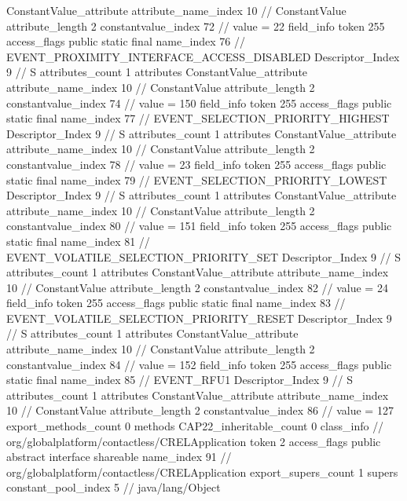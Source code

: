 {{{{{{				ConstantValue_attribute {
					attribute_name_index	10		// ConstantValue
					attribute_length	2
					constantvalue_index	72		// value = 22
				}
				}
			}
			field_info {
				token	255
				access_flags	public static final
				name_index	76		// EVENT_PROXIMITY_INTERFACE_ACCESS_DISABLED
				Descriptor_Index	9		// S
				attributes_count	1
				attributes {
				ConstantValue_attribute {
					attribute_name_index	10		// ConstantValue
					attribute_length	2
					constantvalue_index	74		// value = 150
				}
				}
			}
			field_info {
				token	255
				access_flags	public static final
				name_index	77		// EVENT_SELECTION_PRIORITY_HIGHEST
				Descriptor_Index	9		// S
				attributes_count	1
				attributes {
				ConstantValue_attribute {
					attribute_name_index	10		// ConstantValue
					attribute_length	2
					constantvalue_index	78		// value = 23
				}
				}
			}
			field_info {
				token	255
				access_flags	public static final
				name_index	79		// EVENT_SELECTION_PRIORITY_LOWEST
				Descriptor_Index	9		// S
				attributes_count	1
				attributes {
				ConstantValue_attribute {
					attribute_name_index	10		// ConstantValue
					attribute_length	2
					constantvalue_index	80		// value = 151
				}
				}
			}
			field_info {
				token	255
				access_flags	public static final
				name_index	81		// EVENT_VOLATILE_SELECTION_PRIORITY_SET
				Descriptor_Index	9		// S
				attributes_count	1
				attributes {
				ConstantValue_attribute {
					attribute_name_index	10		// ConstantValue
					attribute_length	2
					constantvalue_index	82		// value = 24
				}
				}
			}
			field_info {
				token	255
				access_flags	public static final
				name_index	83		// EVENT_VOLATILE_SELECTION_PRIORITY_RESET
				Descriptor_Index	9		// S
				attributes_count	1
				attributes {
				ConstantValue_attribute {
					attribute_name_index	10		// ConstantValue
					attribute_length	2
					constantvalue_index	84		// value = 152
				}
				}
			}
			field_info {
				token	255
				access_flags	public static final
				name_index	85		// EVENT_RFU1
				Descriptor_Index	9		// S
				attributes_count	1
				attributes {
				ConstantValue_attribute {
					attribute_name_index	10		// ConstantValue
					attribute_length	2
					constantvalue_index	86		// value = 127
				}
				}
			}
			}
			export_methods_count	0
			methods {
			}
			CAP22_inheritable_count	0
		}
		class_info {		// org/globalplatform/contactless/CRELApplication
			token	2
			access_flags	public abstract interface shareable
			name_index	91		// org/globalplatform/contactless/CRELApplication
			export_supers_count	1
			supers {
				constant_pool_index	5		// java/lang/Object
}}}}
